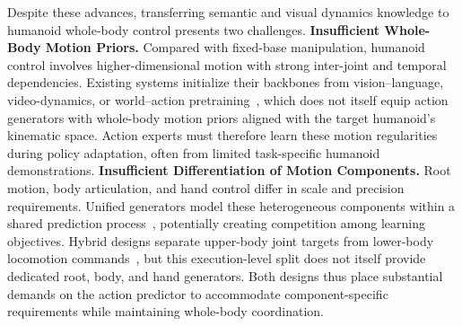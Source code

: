 
Despite these advances, transferring semantic and visual dynamics knowledge to humanoid whole-body control presents two challenges.
\textbf{ Insufficient Whole-Body Motion Priors.}
Compared with fixed-base manipulation, humanoid control involves higher-dimensional motion with strong inter-joint and temporal dependencies. Existing systems initialize their backbones from vision--language, video-dynamics, or world--action pretraining~\cite{grootn1,psi0,motionwam,wholebodywam_wbc}, which does not itself equip action generators with whole-body motion priors aligned with the target humanoid's kinematic space. Action experts must therefore learn these motion regularities during policy adaptation, often from limited task-specific humanoid demonstrations.
\textbf{ Insufficient Differentiation of Motion Components.}
Root motion, body articulation, and hand control differ in scale and precision requirements. Unified generators model these heterogeneous components within a shared prediction process~\cite{openhlm,motionwam}, potentially creating competition among learning objectives. Hybrid designs separate upper-body joint targets from lower-body locomotion commands~\cite{humanoidexo,wholebodyvla}, but this execution-level split does not itself provide dedicated root, body, and hand generators. Both designs thus place substantial demands on the action predictor to accommodate component-specific requirements while maintaining whole-body coordination.


